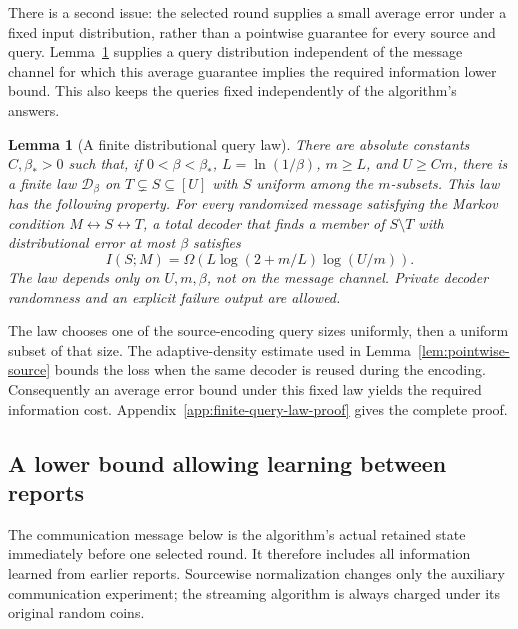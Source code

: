 \documentclass[11pt,letterpaper]{article}
\newtheorem{lemma}[theorem]{Lemma}
\numberwithin{equation}{section}
\begin{document}
There is a second issue: the selected round supplies a small average error under a fixed input distribution, rather than a pointwise guarantee for every source and query.
Lemma~\ref{lem:finite-query-law} supplies a query distribution independent of the message channel for which this average guarantee implies the required information lower bound.
This also keeps the queries fixed independently of the algorithm's answers.

\begin{lemma}[A finite distributional query law]
\label{lem:finite-query-law}
There are absolute constants $C,\beta_*>0$ such that, if $0<\beta<\beta_*$, $L=\ln(1/\beta)$, $m\ge L$, and $U\ge Cm$, there is a finite law $\mathcal D_\beta$ on $T\subsetneq S\subseteq[U]$ with $S$ uniform among the $m$-subsets.
This law has the following property.
For every randomized message satisfying the Markov condition $M\leftrightarrow S\leftrightarrow T$, a total decoder that finds a member of $S\setminus T$ with distributional error at most $\beta$ satisfies
\begin{equation}
I(S;M)=\Omega\!\left(
 L\log(2+m/L)\log(U/m)\right).                   \label{eq:sj1}
\end{equation}
The law depends only on $U,m,\beta$, not on the message channel.
Private decoder randomness and an explicit failure output are allowed.
\end{lemma}

The law chooses one of the source-encoding query sizes uniformly, then a uniform subset of that size.
The adaptive-density estimate used in Lemma~\ref{lem:pointwise-source} bounds the loss when the same decoder is reused during the encoding.
Consequently an average error bound under this fixed law yields the required information cost.
Appendix~\ref{app:finite-query-law-proof} gives the complete proof.

\subsection{A lower bound allowing learning between reports}

The communication message below is the algorithm's actual retained state immediately before one selected round.
It therefore includes all information learned from earlier reports.
Sourcewise normalization changes only the auxiliary communication experiment; the streaming algorithm is always charged under its original random coins.
\end{document}
